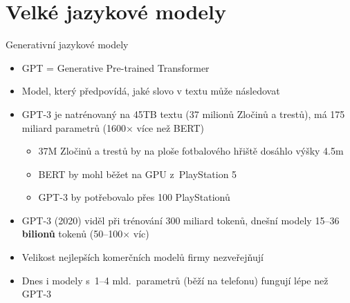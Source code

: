 \section{Velké jazykové modely}

\begin{frame}{Generativní jazykové modely}

    \begin{itemize}[<+->]

        \item GPT = Generative Pre-trained Transformer

        \item Model, který předpovídá, jaké slovo v textu může následovat \\

        \item GPT-3 je natrénovaný na 45TB textu (37 milionů Zločinů a trestů),
            má 175 miliard parametrů (1600$\times$ více než BERT)

            \begin{itemize}[<+->]

                \item 37M Zločinů a trestů by na ploše fotbalového hřiště
                    dosáhlo výšky 4.5m

                \item BERT by mohl běžet na GPU z~PlayStation 5

                \item GPT-3 by potřebovalo přes 100 PlayStationů

            \end{itemize}




		\item GPT-3 (2020) viděl při trénování 300 miliard tokenů, dnešní
				modely 15--36 \textbf{bilionů} tokenů {\small(50--100$\times$ víc)} \\
				{\footnotesize \citep{grattafiori2024llama3,yang2025qwen3}}

		\item Velikost nejlepších komerčních modelů firmy nezveřejňují

		\item Dnes i modely s~1--4 mld.\ parametrů (běží na telefonu)
				fungují lépe než GPT-3

    \end{itemize}

\end{frame}

